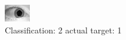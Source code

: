 \begin{figure}[h!]
\begin{center}
\includegraphics[width=0.60\columnwidth]{figures/ID1591_class_2_target_1.png}
\end{center}
\caption{ Classification: 2 actual target: 1}
\label{fig:ID1591_class_2_target_1}
\end{figure}
